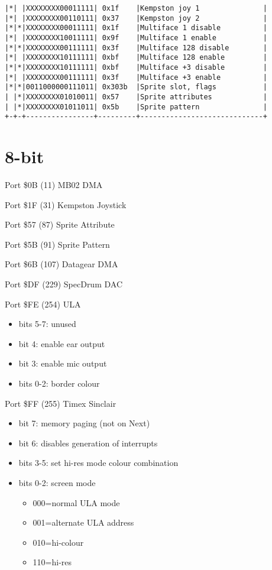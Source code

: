 \begin{verbatim}
|*| |XXXXXXXX00011111| 0x1f    |Kempston joy 1               |  
|*| |XXXXXXXX00110111| 0x37    |Kempston joy 2               |  
|*|*|XXXXXXXX00011111| 0x1f    |Multiface 1 disable          |  
|*| |XXXXXXXX10011111| 0x9f    |Multiface 1 enable           |  
|*|*|XXXXXXXX00111111| 0x3f    |Multiface 128 disable        |  
|*| |XXXXXXXX10111111| 0xbf    |Multiface 128 enable         |  
|*|*|XXXXXXXX10111111| 0xbf    |Multiface +3 disable         |  
|*| |XXXXXXXX00111111| 0x3f    |Multiface +3 enable          |  
|*|*|0011000000111011| 0x303b  |Sprite slot, flags           |  
| |*|XXXXXXXX01010011| 0x57    |Sprite attributes            |  
| |*|XXXXXXXX01011011| 0x5b    |Sprite pattern               |  
+-+-+----------------+---------+-----------------------------+
\end{verbatim}

\section{8-bit}
Port \$0B (11) MB02 DMA

Port \$1F (31) Kempston Joystick

Port \$57 (87) Sprite Attribute

Port \$5B (91) Sprite Pattern

Port \$6B (107) Datagear DMA

Port \$DF (229) SpecDrum DAC

Port \$FE (254) ULA
\begin{itemize}
  \item[] bits 5-7: unused
  \item[] bit 4: enable ear output
  \item[] bit 3: enable mic output
  \item[] bits 0-2: border colour
\end{itemize}

Port \$FF (255) Timex Sinclair
\begin{itemize}
\item[] bit 7: memory paging (not on Next)
\item[] bit 6: disables generation of interrupts
\item[] bits 3-5: set hi-res mode colour combination
\item[] bits 0-2: screen mode
  \begin{itemize}
  \item[] 000=normal ULA mode
  \item[] 001=alternate ULA address
  \item[] 010=hi-colour
  \item[] 110=hi-res
  \end{itemize}
\end{itemize}

